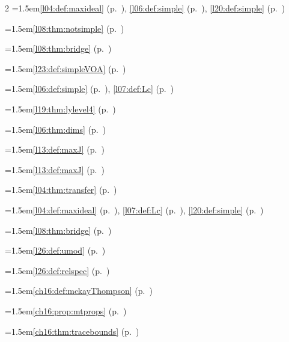 \begin{multicols}{2}
\hangindent=1.5em\quad \ref{l04:def:maxideal} (p.~\pageref{l04:def:maxideal}), \ref{l06:def:simple} (p.~\pageref{l06:def:simple}), \ref{l20:def:simple} (p.~\pageref{l20:def:simple})\par
\hangindent=1.5em\quad \ref{l08:thm:notsimple} (p.~\pageref{l08:thm:notsimple})\par
\hangindent=1.5em\quad \ref{l08:thm:bridge} (p.~\pageref{l08:thm:bridge})\par
\hangindent=1.5em\quad \ref{l23:def:simpleVOA} (p.~\pageref{l23:def:simpleVOA})\par
\hangindent=1.5em\quad \ref{l06:def:simple} (p.~\pageref{l06:def:simple}), \ref{l07:def:Lc} (p.~\pageref{l07:def:Lc})\par
\hangindent=1.5em\quad \ref{l19:thm:lylevel4} (p.~\pageref{l19:thm:lylevel4})\par
\hangindent=1.5em\quad \ref{l06:thm:dims} (p.~\pageref{l06:thm:dims})\par
\hangindent=1.5em\quad \ref{l13:def:maxJ} (p.~\pageref{l13:def:maxJ})\par
\hangindent=1.5em\quad \ref{l13:def:maxJ} (p.~\pageref{l13:def:maxJ})\par
\hangindent=1.5em\quad \ref{l04:thm:transfer} (p.~\pageref{l04:thm:transfer})\par
\hangindent=1.5em\quad \ref{l04:def:maxideal} (p.~\pageref{l04:def:maxideal}), \ref{l07:def:Lc} (p.~\pageref{l07:def:Lc}), \ref{l20:def:simple} (p.~\pageref{l20:def:simple})\par
\hangindent=1.5em\quad \ref{l08:thm:bridge} (p.~\pageref{l08:thm:bridge})\par
\hangindent=1.5em\quad \ref{l26:def:umod} (p.~\pageref{l26:def:umod})\par
\hangindent=1.5em\quad \ref{l26:def:relspec} (p.~\pageref{l26:def:relspec})\par
\hangindent=1.5em\quad \ref{ch16:def:mckayThompson} (p.~\pageref{ch16:def:mckayThompson})\par
\hangindent=1.5em\quad \ref{ch16:prop:mtprops} (p.~\pageref{ch16:prop:mtprops})\par
\hangindent=1.5em\quad \ref{ch16:thm:tracebounds} (p.~\pageref{ch16:thm:tracebounds})\par

\end{multicols}
